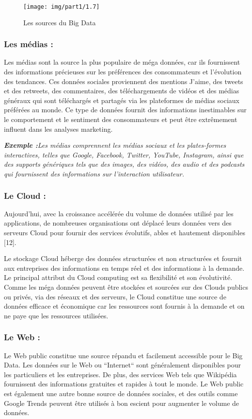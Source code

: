 \begin{figure}[h]
	\centering
    \texttt{[image: img/part1/1.7]}
    \caption{Les sources du Big Data}
\end{figure}

\subsubsection{Les médias :}
Les médias sont la source la plus populaire de méga données, car ils fournissent des informations précieuses sur les préférences des consommateurs et l'évolution des tendances. Ces données sociales proviennent des mentions J'aime, des tweets et des retweets, des commentaires, des téléchargements de vidéos et des médias généraux qui sont téléchargés et partagés via les plateformes de médias sociaux préférées au monde. Ce type de données fournit des informations inestimables sur le comportement et le sentiment des consommateurs et peut être extrêmement influent dans les analyses marketing.

\textit{\textbf{Exemple :}Les médias comprennent les médias sociaux et les plates-formes interactives, telles que Google, Facebook, Twitter, YouTube, Instagram, ainsi que des supports génériques tels que des images, des vidéos, des audio et des podcasts qui fournissent des informations sur l'interaction utilisateur.}

\subsubsection{Le Cloud :}
Aujourd'hui, avec la croissance accélérée du volume de données utilisé par les applications, de nombreuses organisations ont déplacé leurs données vers des serveurs Cloud pour fournir des services évolutifs,  ables et hautement disponibles [12].

Le stockage Cloud héberge des données structurées et non structurées et fournit aux entreprises des informations en temps réel et des informations à la demande. Le principal attribut du Cloud computing est sa flexibilité et son évolutivité. Comme les méga données peuvent être stockées et sourcées sur des Clouds publics ou privés, via des réseaux et des serveurs, le Cloud constitue une source de données efficace et économique car les ressources sont fournis à la demande et on ne paye que les ressources utilisées.

\subsubsection{Le Web :}
Le Web public constitue une source répandu et facilement accessible pour le Big Data. Les données sur le Web ou “Internet“ sont généralement disponibles pour les particuliers et les entreprises. De plus, des services Web tels que Wikipédia fournissent des informations gratuites et rapides à tout le monde. Le Web public est également une autre bonne source de données sociales, et des outils comme Google Trends peuvent être utilisés à bon escient pour augmenter le volume de données.

